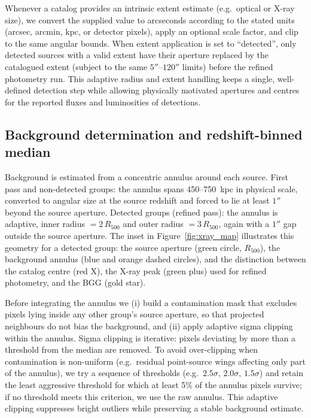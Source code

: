\documentclass{aa}
\begin{document}
Whenever a catalog provides an intrinsic extent estimate (e.g.\ optical or X-ray size), we convert the supplied value to arcseconds according to the stated units (arcsec, arcmin, kpc, or detector pixels), apply an optional scale factor, and clip to the same angular bounds. When extent application is set to ``detected'', only detected sources with a valid extent have their aperture replaced by the catalogued extent (subject to the same $5''$--$120''$ limits) before the refined photometry run. This adaptive radius and extent handling keeps a single, well-defined detection step while allowing physically motivated apertures and centres for the reported fluxes and luminosities of detections.

\subsection{Background determination and redshift-binned median}
\label{sec:background}

Background is estimated from a concentric annulus around each source. First pass and non-detected groups: the annulus spans 450--750~kpc in physical scale, converted to angular size at the source redshift and forced to lie at least $1''$ beyond the source aperture. Detected groups (refined pass): the annulus is adaptive, inner radius $= 2\,R_{500}$ and outer radius $= 3\,R_{500}$, again with a $1''$ gap outside the source aperture. The inset in Figure~\ref{fig:xray_map} illustrates this geometry for a detected group: the source aperture (green circle, $R_{500}$), the background annulus (blue and orange dashed circles), and the distinction between the catalog centre (red X), the X-ray peak (green plus) used for refined photometry, and the BGG (gold star).

Before integrating the annulus we (i) build a contamination mask that excludes pixels lying inside any other group's source aperture, so that projected neighbours do not bias the background, and (ii) apply adaptive sigma clipping within the annulus. Sigma clipping is iterative: pixels deviating by more than a threshold from the median are removed. To avoid over-clipping when contamination is non-uniform (e.g.\ residual point-source wings affecting only part of the annulus), we try a sequence of thresholds (e.g.\ $2.5\sigma$, $2.0\sigma$, $1.5\sigma$) and retain the least aggressive threshold for which at least 5\% of the annulus pixels survive; if no threshold meets this criterion, we use the raw annulus. This adaptive clipping suppresses bright outliers while preserving a stable background estimate.
\end{document}
